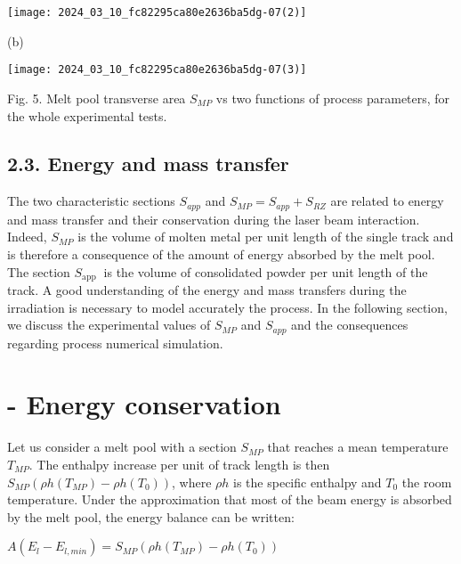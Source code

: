 \documentclass[10pt]{article}
\begin{document}
\begin{center}
\texttt{[image: 2024\_03\_10\_fc82295ca80e2636ba5dg-07(2)]}
\end{center}

(b)

\begin{center}
\texttt{[image: 2024\_03\_10\_fc82295ca80e2636ba5dg-07(3)]}
\end{center}

Fig. 5. Melt pool transverse area $S_{M P}$ vs two functions of process parameters, for the whole experimental tests.

\subsection*{2.3. Energy and mass transfer}
The two characteristic sections $S_{a p p}$ and $S_{M P}=S_{a p p}+S_{R Z}$ are related to energy and mass transfer and their conservation during the laser beam interaction. Indeed, $S_{M P}$ is the volume of molten metal per unit length of the single track and is therefore a consequence of the amount of energy absorbed by the melt pool. The section $S_{\text {app }}$ is the volume of consolidated powder per unit length of the track. A good understanding of the energy and mass transfers during the irradiation is necessary to model accurately the process. In the following section, we discuss the experimental values of $S_{M P}$ and $S_{a p p}$ and the consequences regarding process numerical simulation.

\section*{- Energy conservation}
Let us consider a melt pool with a section $S_{M P}$ that reaches a mean temperature $T_{M P}$. The enthalpy increase per unit of track length is then $S_{M P}\left(\rho h\left(T_{M P}\right)-\rho h\left(T_{0}\right)\right)$, where $\rho h$ is the specific enthalpy and $T_{0}$ the room temperature. Under the approximation that most of the beam energy is absorbed by the melt pool, the energy balance can be written:

$A\left(E_{l}-E_{l, m i n}\right)=S_{M P}\left(\rho h\left(T_{M P}\right)-\rho h\left(T_{0}\right)\right)$
\end{document}
